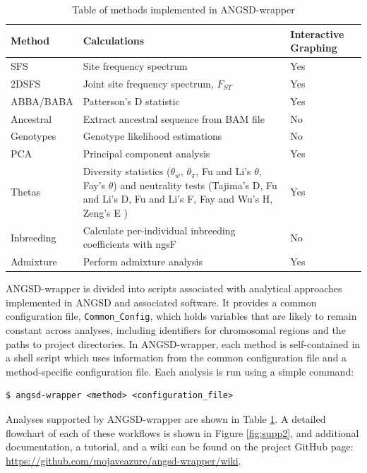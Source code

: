 \documentclass[10pt,a4paper]{article}
\newcommand{\fst}{${F_{ST}}$ }
\begin{document}
\begin{table}
\begin{center}
    \caption{Table of methods implemented in ANGSD-wrapper}
    \begin{tabular}{ | p{3.5cm} | p{5cm} | p{2.5cm}  |}
    \hline
    \textbf{Method} & \textbf{Calculations} & \textbf{Interactive Graphing} \\ \hline
    SFS     &    Site frequency spectrum  & Yes  \\ \hline     2DSFS   &    Joint site frequency spectrum, \fst & Yes  \\ \hline 
    ABBA/BABA  &  Patterson's D statistic & Yes  \\ \hline 
    Ancestral &  Extract ancestral sequence from BAM file  & No \\ \hline 
    Genotypes &  Genotype likelihood estimations & No  \\ \hline 
    PCA     &    Principal component analysis & Yes  \\ \hline 
    Thetas   &   Diversity statistics ($\theta_w$, $\theta_\pi$, Fu and Li's $\theta$, Fay's $\theta$) and neutrality tests (Tajima's D, Fu and Li's D, Fu and Li's F,  Fay and Wu's H, Zeng's E ) & Yes  \\ \hline 
    Inbreeding & Calculate per-individual inbreeding coefficients with ngsF & No  \\ \hline 
    Admixture  & Perform admixture analysis & Yes  \\ \hline 
    \end{tabular}
    \label{tab:methods}
    \end{center}
\end{table}

ANGSD-wrapper is divided into scripts associated with analytical approaches implemented in ANGSD and associated software. 
It provides a common configuration file, \texttt{Common\_Config}, which holds variables that are likely to remain constant across analyses, including identifiers for chromosomal regions and the paths to project directories.
In ANGSD-wrapper, each method is self-contained in a shell script which uses information from the common configuration file and a method-specific configuration file. 
Each analysis is run using a simple command:

\begin{lstlisting}
$ angsd-wrapper <method> <configuration_file>
\end{lstlisting}

Analyses supported by ANGSD-wrapper are shown in Table \ref{tab:methods}.
A detailed flowchart of each of these workflows is shown in Figure \ref{fig:supp2}, and additional  documentation, a tutorial, and a wiki can be found on the project GitHub page: \url{https://github.com/mojaveazure/angsd-wrapper/wiki}.
\end{document}
